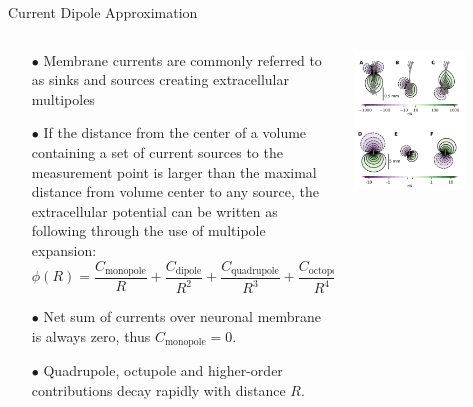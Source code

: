 \documentclass[aspectratio=169, 9pt]{beamer}
\begin{document}
\begin{frame}{Current Dipole Approximation}
  \begin{columns}
    \begin{column}{0.5\textwidth}
      \begin{itemize}
        \item[$\bullet$] Membrane currents are commonly referred to as sinks and sources creating extracellular multipoles
        \item[$\bullet$] If the distance from the center of a volume containing a set of current sources to the measurement point is larger than the maximal distance from volume center to any source, the extracellular potential can be written as following through the use of multipole expansion:
          \begin{equation}
            \phi(R) = \frac{C_\text{monopole}}{R} + \frac{C_\text{dipole}}{R^2} + \frac{C_\text{quadrupole}}{R^3} + \frac{C_\text{octopole}}{R^4} + \ldots
          \end{equation}
        \item[$\bullet$] Net sum of currents over neuronal membrane is always zero, thus $C_\text{monopole} = 0$.
        \item[$\bullet$] Quadrupole, octupole and higher-order contributions decay rapidly with distance $R$.
      \end{itemize}
    \end{column}
    \begin{column}{0.5\textwidth}
      \includegraphics[width=0.7\textwidth]{figures/dipole_pattern.png}
    \end{column}
  \end{columns}
\end{frame}
\end{document}
